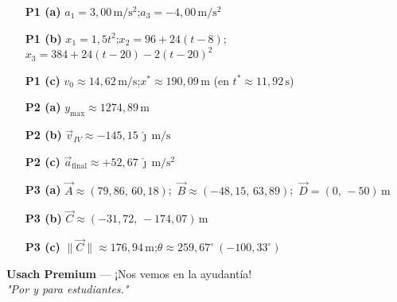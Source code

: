 \documentclass[letterpaper, 11pt]{article}
\begin{document}
\begin{tcolorbox}[colback=verdePaso!8, colframe=verdePaso, arc=8pt,
    boxrule=1pt, enhanced, breakable,
    title={\bfseries\color{white} Resumen de resultados},
    colbacktitle=verdePaso, fonttitle=\bfseries]
\small
\begin{itemize}[leftmargin=1.6cm, itemsep=3pt]
\item[\textbf{P1 (a)}] $a_1=3{,}00\,\mathrm{m/s^2}$;\quad $a_3=-4{,}00\,\mathrm{m/s^2}$
\item[\textbf{P1 (b)}] $x_1=1{,}5t^2$;\quad $x_2=96+24(t-8)$;\quad $x_3=384+24(t-20)-2(t-20)^2$
\item[\textbf{P1 (c)}] $v_0\approx 14{,}62\,\mathrm{m/s}$;\quad $x^{*}\approx 190{,}09\,\mathrm{m}$ (en $t^{*}\approx 11{,}92\,\mathrm{s}$)
\item[\textbf{P2 (a)}] $y_{\max}\approx 1274{,}89\,\mathrm{m}$
\item[\textbf{P2 (b)}] $\vec{v}_{IV}\approx -145{,}15\,\hat{\jmath}\,\mathrm{m/s}$
\item[\textbf{P2 (c)}] $\vec{a}_{\mathrm{final}}\approx +52{,}67\,\hat{\jmath}\,\mathrm{m/s^2}$
\item[\textbf{P3 (a)}] $\vec{A}\approx(79{,}86,\,60{,}18)$;\ $\vec{B}\approx(-48{,}15,\,63{,}89)$;\ $\vec{D}=(0,\,-50)\,\mathrm{m}$
\item[\textbf{P3 (b)}] $\vec{C}\approx(-31{,}72,\,-174{,}07)\,\mathrm{m}$
\item[\textbf{P3 (c)}] $\lVert\vec{C}\rVert\approx 176{,}94\,\mathrm{m}$;\quad $\theta\approx 259{,}67^\circ\ (-100{,}33^\circ)$
\end{itemize}
\end{tcolorbox}

\vspace{0.8cm}
\begin{center}
    \small\textbf{Usach Premium} --- ¡Nos vemos en la ayudant\'ia! \\
    \textit{"Por y para estudiantes."}
\end{center}
\end{document}
